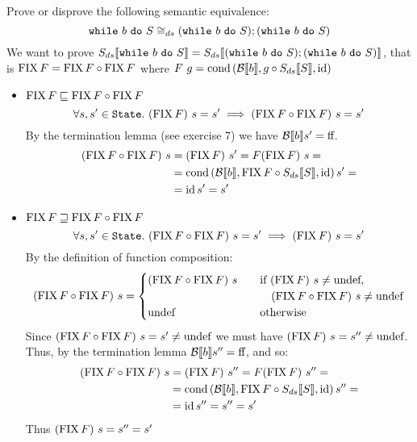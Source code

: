\begin{exercise}{
    Prove or disprove the following semantic equivalence:
    \[ \wwhile{b}{S} \DScong (\wwhile{b}{S});(\wwhile{b}{S}) \]
}
    We want to prove $\Sds{\wwhile{b}{S}} = \Sds{(\wwhile{b}{S});(\wwhile{b}{S})}$, that is $\FIX F = \FIX F \circ \FIX F$ where $F\ g = \cond{\Bool{b}}{g \circ \Sds{S}}{\id}$
    \begin{itemize}
        \item $\FIX F \sqsubseteq \FIX F \circ \FIX F$
            \[ \forall s, s' \in \State.\ (\FIX F)\ s = s' \implies (\FIX F \circ \FIX F)\ s = s' \]
            By the termination lemma (see exercise 7) we have $\Bool{b} s' = \False$.
            \begin{align*}
                (\FIX F \circ \FIX F)\ s &= (\FIX F)\ s' = F(\FIX F)\ s = \\
                &= \cond{\Bool{b}}{\FIX F \circ \Sds{S}}{\id} s' = \\
                &= \id s' = s'
            \end{align*}
        \item $\FIX F \sqsupseteq \FIX F \circ \FIX F$
            \[ \forall s, s' \in \State.\ (\FIX F \circ \FIX F)\ s = s' \implies (\FIX F)\ s = s' \]
            By the definition of function composition:
            \[
                (\FIX F \circ \FIX F)\ s = \begin{cases}
                    (\FIX F \circ \FIX F)\ s &\quad \text{if } (\FIX F)\ s \neq \undef, \\
                        &\quad\quad (\FIX F \circ \FIX F)\ s \neq \undef \\
                    \undef &\quad \text{otherwise}
                \end{cases}
            \]
            Since $(\FIX F \circ \FIX F)\ s = s' \neq \undef$ we must have $(\FIX F)\ s = s'' \neq \undef$. Thus, by the termination lemma $\Bool{b} s'' = \False$, and so:
            \begin{align*}
                (\FIX F \circ \FIX F)\ s &= (\FIX F)\ s'' = F(\FIX F)\ s'' = \\
                &= \cond{\Bool{b}}{\FIX F \circ \Sds{S}}{\id} s'' = \\
                &= \id s'' = s'' = s'
            \end{align*}
            Thus $(\FIX F)\ s = s'' = s'$
    \end{itemize}
\end{exercise}
